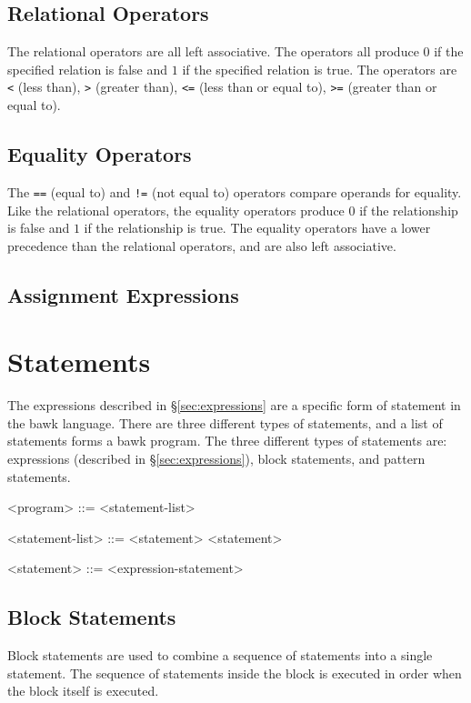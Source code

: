 \documentclass[letterpaper]{article}
\begin{document}

\subsection{Relational Operators}
The relational operators are all left associative.  The operators all produce $0$ if the specified relation is false and $1$ if the specified relation is true.  The operators are \texttt{<} (less than), \texttt{>} (greater than), \texttt{<=} (less than or equal to), \texttt{>=} (greater than or equal to).

\subsection{Equality Operators}
The \texttt{==} (equal to) and \texttt{!=} (not equal to) operators compare operands for equality.  Like the relational operators, the equality operators produce $0$ if the relationship is false and $1$ if the relationship is true.  The equality operators have a lower precedence than the relational operators, and are also left associative.


\subsection{Assignment Expressions}


\section{Statements}
\label{sec:statements}
The expressions described in \S\ref{sec:expressions} are a specific form of statement in the bawk language.  There are three different types of statements, and a list of statements forms a bawk program.  The three different types of statements are: expressions (described in \S\ref{sec:expressions}), block statements, and pattern statements.
\begin{grammar}
<program> ::= <statement-list>

<statement-list> ::= <statement>
 <statement>

<statement> ::= <expression-statement>
\end{grammar}

\subsection{Block Statements}
Block statements are used to combine a sequence of statements into a single statement.  The sequence of statements inside the block is executed in order when the block itself is executed.
\end{document}
